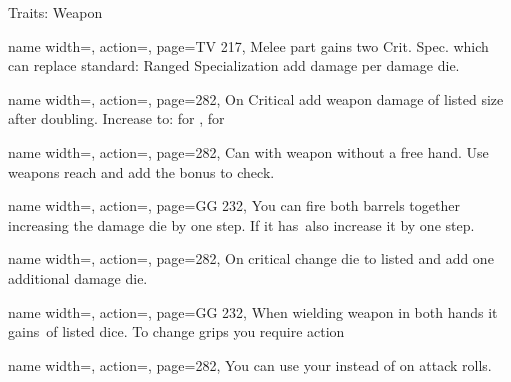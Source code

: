 \begin{PageBackLandscape}
\begin{TablesHalf}{\backTableHeight}
\begin{Table}{Traits: Weapon}
\begin{entry}{}{%
                name width=\conditionLength,%
                action=\CriticalFusion,
                page=TV 217,
            }
                Melee part gains two Crit. Spec. which can replace standard:  \hfill
                Ranged Specialization\hfill
                add  damage per damage die.\hfill
            \end{entry}
            \breakLine
            \begin{entry}{}{%
                name width=\conditionLength,%
                action=\Deadly,
                page=282,
            }
                On Critical add weapon damage of listed size after doubling.
                Increase to:  for ,  for 
            \end{entry}
            \begin{entry}{}{%
                name width=\conditionLength,%
                action=\Disarm,
                page=282,
            }
                Can  with weapon without a free hand.
                Use weapons reach and add the \Item bonus to check. \hfill
            \end{entry}
            \begin{entry}{}{%
                name width=\conditionLength,%
                action=\DoubleBarrel,
                page=GG 232,
            }
                You can fire both barrels together increasing the damage die by one step.
                If it has \Fatal\,also increase it by one step.
            \end{entry}
            \breakLine
            \begin{entry}{}{%
                name width=\conditionLength,%
                action=\Fatal,
                page=282,
            }
                On critical change die to listed and add one additional damage die.
            \end{entry}
            \begin{entry}{}{%
                name width=\conditionLength,%
                action=\FatalAim,
                page=GG 232,
            }
                When wielding weapon in both hands it gains \Fatal\,of listed dice.
                To change grips you require  action
            \end{entry}
            \begin{entry}{}{%
                name width=\conditionLength,%
                action=\Finesse,
                page=282,
            }
                You can use your \Dexterity instead of \Strength on attack rolls.

\end{entry}
\end{Table}
\end{TablesHalf}
\end{PageBackLandscape}

